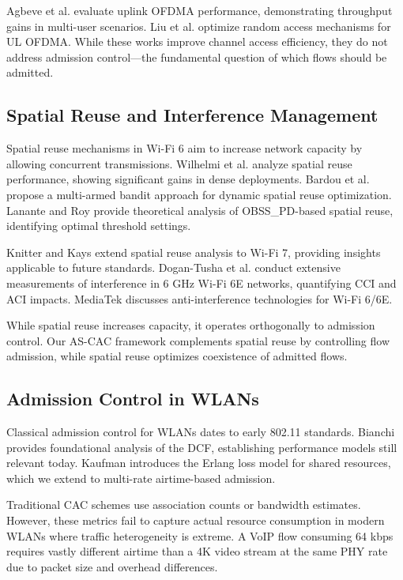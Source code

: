 \documentclass[conference]{IEEEtran}
\begin{document}
Agbeve et al. \cite{7} evaluate uplink OFDMA performance, demonstrating throughput gains in multi-user scenarios. Liu et al. \cite{11} optimize random access mechanisms for UL OFDMA. While these works improve channel access efficiency, they do not address admission control—the fundamental question of which flows should be admitted.

\subsection{Spatial Reuse and Interference Management}

Spatial reuse mechanisms in Wi-Fi 6 aim to increase network capacity by allowing concurrent transmissions. Wilhelmi et al. \cite{17} analyze spatial reuse performance, showing significant gains in dense deployments. Bardou et al. \cite{1} propose a multi-armed bandit approach for dynamic spatial reuse optimization. Lanante and Roy \cite{10} provide theoretical analysis of OBSS\_PD-based spatial reuse, identifying optimal threshold settings.

Knitter and Kays \cite{9} extend spatial reuse analysis to Wi-Fi 7, providing insights applicable to future standards. Dogan-Tusha et al. \cite{4} conduct extensive measurements of interference in 6 GHz Wi-Fi 6E networks, quantifying CCI and ACI impacts. MediaTek \cite{12} discusses anti-interference technologies for Wi-Fi 6/6E.

While spatial reuse increases capacity, it operates orthogonally to admission control. Our AS-CAC framework complements spatial reuse by controlling flow admission, while spatial reuse optimizes coexistence of admitted flows.

\subsection{Admission Control in WLANs}

Classical admission control for WLANs dates to early 802.11 standards. Bianchi \cite{3} provides foundational analysis of the DCF, establishing performance models still relevant today. Kaufman \cite{8} introduces the Erlang loss model for shared resources, which we extend to multi-rate airtime-based admission.

Traditional CAC schemes use association counts or bandwidth estimates. However, these metrics fail to capture actual resource consumption in modern WLANs where traffic heterogeneity is extreme. A VoIP flow consuming 64 kbps requires vastly different airtime than a 4K video stream at the same PHY rate due to packet size and overhead differences.
\end{document}
